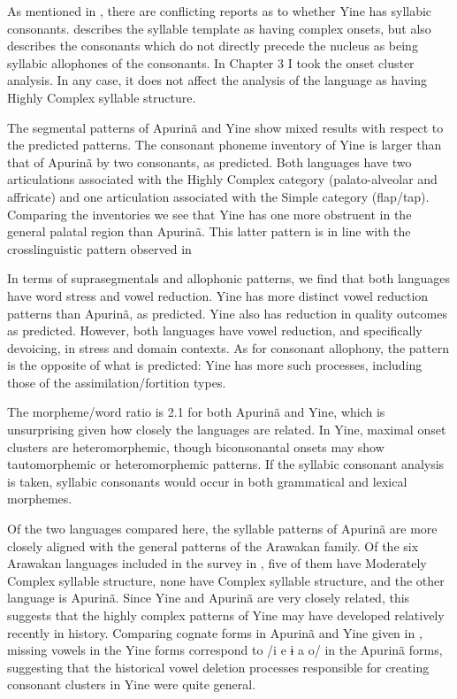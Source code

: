   As mentioned in , there are conflicting reports as to whether Yine has syllabic consonants. \citet{Matteson1965} describes the syllable template as having complex onsets, but also describes the consonants which do not directly precede the nucleus as being syllabic allophones of the consonants. In Chapter 3 I took the onset cluster analysis. In any case, it does not affect the analysis of the language as having Highly Complex syllable structure.

  The segmental patterns of Apurinã and Yine show mixed results with respect to the predicted patterns. The consonant phoneme inventory of Yine is larger than that of Apurinã by two consonants, as predicted. Both languages have two articulations associated with the Highly Complex category (palato-alveolar and affricate) and one articulation associated with the Simple category (flap/tap). Comparing the inventories we see that Yine has one more obstruent in the general palatal region than Apurinã. This latter pattern is in line with the crosslinguistic pattern observed in 

  In terms of suprasegmentals and allophonic patterns, we find that both languages have word stress and vowel reduction. Yine has more distinct vowel reduction patterns than Apurinã, as predicted. Yine also has reduction in quality outcomes as predicted. However, both languages have vowel reduction, and specifically devoicing, in stress and domain contexts. As for consonant allophony, the pattern is the opposite of what is predicted: Yine has more such processes, including those of the assimilation/fortition types.

  The morpheme/word ratio is 2.1 for both Apurinã and Yine, which is unsurprising given how closely the languages are related. In Yine, maximal onset clusters are heteromorphemic, though biconsonantal onsets may show tautomorphemic or heteromorphemic patterns. If the syllabic consonant analysis is taken, syllabic consonants would occur in both grammatical and lexical morphemes.

  Of the two languages compared here, the syllable patterns of Apurinã are more closely aligned with the general patterns of the Arawakan family. Of the six Arawakan languages included in the survey in \citet{Maddieson2013a}, five of them have Moderately Complex syllable structure, none have Complex syllable structure, and the other language is Apurinã. Since Yine and Apurinã are very closely related, this suggests that the highly complex patterns of Yine may have developed relatively recently in history. Comparing cognate forms in Apurinã and Yine given in \citet[88-9]{Facundes2002}, missing vowels in the Yine forms correspond to /i e ɨ a o/ in the Apurinã forms, suggesting that the historical vowel deletion processes responsible for creating consonant clusters in Yine were quite general.

